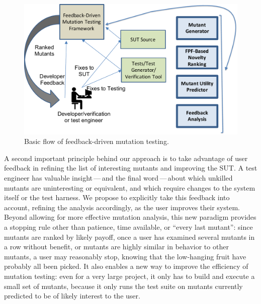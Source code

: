 \begin{figure}
\centering
\includegraphics[width=0.6\columnwidth]{TestFlow}

\caption{Basic flow of feedback-driven mutation testing. }
\label{fig:flow}
\end{figure}

A second important principle behind our approach is to take advantage of user
feedback in refining the list of interesting mutants and improving the SUT.
A test engineer has valuable insight\,---\,and the final word\,---\,about which
unkilled mutants are uninteresting or equivalent, and which require changes to
the system itself or the test harness.  We propose to explicitly take this
feedback into account, refining the analysis accordingly, as the user improves
their system.  Beyond allowing for more effective mutation analysis,
this new paradigm provides a stopping rule other than patience, time available, or
``every last mutant'':  since mutants are ranked by likely payoff, once a user
has examined several mutants in a row without benefit, or mutants are highly
similar in behavior to other mutants, a user may reasonably stop, knowing that
the low-hanging fruit have probably all been picked.
 It also enables a new way to improve the efficiency of
mutation testing:  even for a very large project, it only has to build and
execute a small set of mutants, because it only runs the test suite on mutants
currently predicted to be of likely interest to the user.

